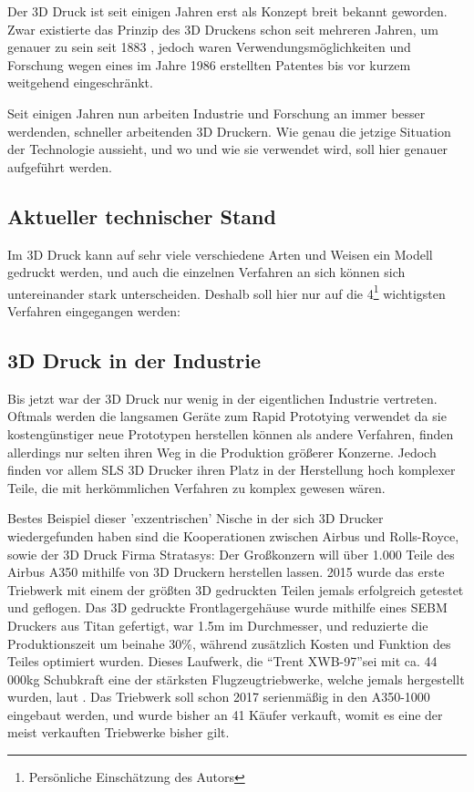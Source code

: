 
Der 3D Druck ist seit einigen Jahren erst als Konzept breit bekannt geworden.
Zwar existierte das Prinzip des 3D Druckens schon seit mehreren Jahren, um genauer zu sein seit 1883 \parencite{CHUCK}, jedoch waren Verwendungsmöglichkeiten und Forschung wegen eines im Jahre 1986 erstellten Patentes bis vor kurzem weitgehend eingeschränkt.

Seit einigen Jahren nun arbeiten Industrie und Forschung an immer besser werdenden, schneller arbeitenden 3D Druckern. Wie genau die jetzige Situation der Technologie aussieht, und wo und wie sie verwendet wird, soll hier genauer aufgeführt werden.

\subsection{Aktueller technischer Stand}

Im 3D Druck kann auf sehr viele verschiedene Arten und Weisen ein Modell gedruckt werden, und auch die einzelnen Verfahren an sich können sich untereinander stark unterscheiden.
Deshalb soll hier nur auf die 4\footnote{Persönliche Einschätzung des Autors} wichtigsten Verfahren eingegangen werden:






\subsection{3D Druck in der Industrie}

Bis jetzt war der 3D Druck nur wenig in der eigentlichen Industrie vertreten. Oftmals werden die langsamen Geräte zum Rapid Prototying verwendet da sie kostengünstiger neue Prototypen herstellen können als andere Verfahren, finden allerdings nur selten ihren Weg in die Produktion größerer Konzerne. Jedoch finden vor allem SLS 3D Drucker ihren Platz in der Herstellung hoch komplexer Teile, die mit herkömmlichen Verfahren zu komplex gewesen wären. 

Bestes Beispiel dieser 'exzentrischen' Nische in der sich 3D Drucker wiedergefunden haben sind die Kooperationen zwischen Airbus und Rolls-Royce, sowie der 3D Druck Firma Stratasys: Der Großkonzern will über 1.000 Teile des Airbus A350 mithilfe von 3D Druckern herstellen lassen. 2015 wurde das erste Triebwerk mit einem der größten 3D gedruckten Teilen jemals erfolgreich getestet und geflogen. Das 3D gedruckte Frontlagergehäuse wurde mithilfe eines SEBM Druckers aus Titan gefertigt, war 1.5m im Durchmesser, und reduzierte die Produktionszeit um beinahe 30\%, während zusätzlich Kosten und Funktion des Teiles optimiert wurden. Dieses Laufwerk, die \textquotedblleft Trent XWB-97\textquotedblright sei mit ca. 44 000kg Schubkraft eine der stärksten Flugzeugtriebwerke, welche jemals hergestellt wurden, laut \textcite{TRENT}. Das Triebwerk soll schon 2017 serienmäßig in den A350-1000 eingebaut werden, und wurde bisher an 41 Käufer verkauft, womit es eine der meist verkauften Triebwerke bisher gilt.

